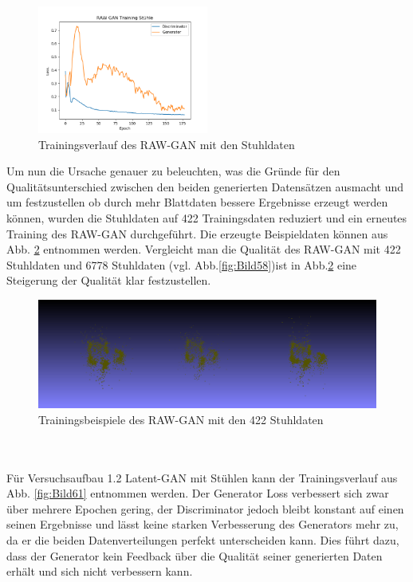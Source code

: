 \documentclass{llncs}
\begin{document}
\begin{figure}[htbp] 
	\centering
	\includegraphics[width=0.5\textwidth]{raw_gan_chair_result.png}
	\caption{Trainingsverlauf des RAW-GAN mit den Stuhldaten}
	\label{fig:Bild57}
\end{figure}
\pagebreak\linebreak 
Um nun die Ursache genauer zu beleuchten, was die Gründe für  den Qualitätsunterschied zwischen den beiden generierten Datensätzen ausmacht und um festzustellen ob durch mehr Blattdaten bessere Ergebnisse erzeugt werden können, wurden die Stuhldaten auf 422 Trainingsdaten reduziert und ein erneutes Training des RAW-GAN durchgeführt. Die erzeugte Beispieldaten können aus Abb. \ref{fig:Bild60} entnommen werden. Vergleicht man die Qualität des RAW-GAN mit 422 Stuhldaten und 
6778 Stuhldaten (vgl. Abb.\ref{fig:Bild58})ist in Abb.\ref{fig:Bild60} eine Steigerung der Qualität klar festzustellen. 
\begin{figure}[htbp] 
	\centering
	\includegraphics[width=1.0\textwidth]{raw_gan_result_400_result.png}
	\caption{Trainingsbeispiele des RAW-GAN mit den 422 Stuhldaten}
	\label{fig:Bild60}
\end{figure}
~\\\\
Für Versuchsaufbau 1.2 Latent-GAN mit Stühlen kann der Trainingsverlauf aus Abb. \ref{fig:Bild61} entnommen werden. Der Generator Loss verbessert sich zwar über mehrere Epochen gering, der Discriminator jedoch bleibt konstant auf einen seinen Ergebnisse und lässt keine starken Verbesserung des Generators mehr zu, da er die beiden Datenverteilungen perfekt unterscheiden kann. Dies führt dazu, dass der Generator kein Feedback über die Qualität seiner generierten Daten erhält und sich nicht verbessern kann.  
\end{document}
